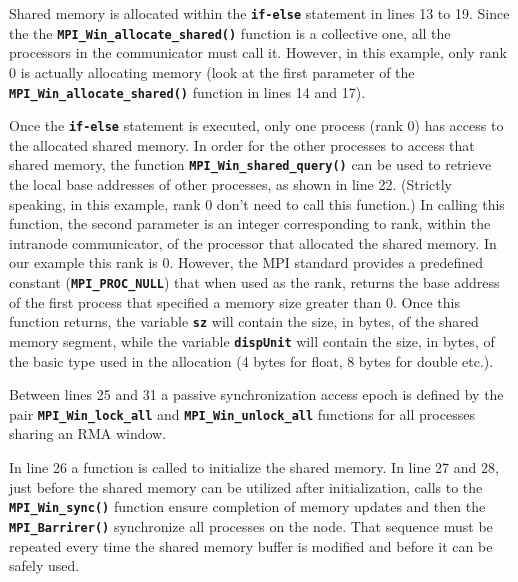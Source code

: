 \medskip

Shared memory is allocated within the \textbf{\texttt{if-else}} statement in lines 13 to 19. Since the the \textbf{\texttt{MPI\_Win\_allocate\_shared()}} function is a collective one, all the processors in the communicator must call it. However, in this example, only rank 0 is actually allocating memory (look at the first parameter of the \textbf{\texttt{MPI\_Win\_allocate\_shared()}} function in lines 14 and 17). 

\medskip

Once the \textbf{\texttt{if-else}} statement is executed, only one process (rank 0) has access to the allocated shared memory. In order for the other processes to access that shared memory, the function \textbf{\texttt{MPI\_Win\_shared\_query()}} can be used to retrieve the local base addresses of other processes, as shown in line 22. (Strictly speaking, in this example, rank 0 don't need to call this function.) In calling this function, the second parameter is an integer corresponding to rank, within the intranode communicator, of the processor that allocated the shared memory. In our example this rank is 0. However, the MPI standard provides a predefined constant (\textbf{\texttt{MPI\_PROC\_NULL}}) that when used as the rank, returns the base address of the first process that specified a memory size greater than 0. Once this function returns, the variable \textbf{\texttt{sz}} will contain the size, in bytes, of the shared memory segment, while the variable \textbf{\texttt{dispUnit}} will contain the size, in bytes, of the basic type used in the allocation (4 bytes for float, 8 bytes for double etc.).


\medskip

Between lines 25 and 31 a passive synchronization access epoch is defined by the pair  \textbf{\texttt{MPI\_Win\_lock\_all}} and \textbf{\texttt{MPI\_Win\_unlock\_all}} functions for all processes sharing an RMA window.

\medskip

In line 26 a function is called to initialize the shared memory. In line 27 and 28, just before the shared memory can be utilized after initialization, calls to the \textbf{\texttt{MPI\_Win\_sync()}} function ensure completion of memory updates and then the \textbf{\texttt{MPI\_Barrirer()}} synchronize all processes on the node. That sequence must be repeated every time the shared memory buffer is modified and before it can be safely used.


\medskip

